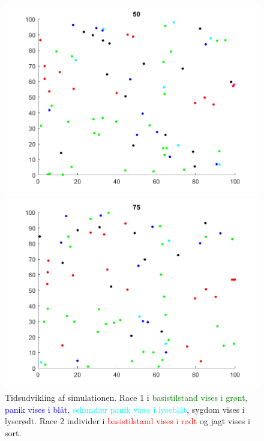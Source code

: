 \documentclass[a4paper,10pt]{article} 	%
\numberwithin{equation}{section}
\begin{document}
\begin{figure}[H]
\begin{minipage}{0.45\textwidth}
		\end{minipage}
		\begin{minipage}{0.45\textwidth}
			\centering
			\includegraphics[width=\textwidth]{img/plot3.png}
		\end{minipage}
		\begin{minipage}{0.45\textwidth}
			\centering
			\includegraphics[width=\textwidth]{img/plot4.png}
		\end{minipage}
	\caption{Tidsudvikling af simulationen. Race 1 i \textcolor{green}{basistilstand vises i grønt}, \textcolor{blue}{panik vises i blåt}, \textcolor{cyan}{sekundær panik vises i lyseblåt}, \textcolor{VioletRed}{sygdom vises i lyserødt}. Race 2 individer i \textcolor{red}{basistilstand vises i rødt} og jagt vises i sort.}
	\end{figure}
\end{document}
